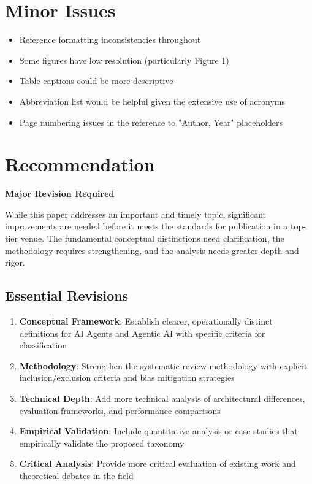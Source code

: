 \documentclass[12pt]{article}
\begin{document}
{\section{Minor Issues}

\begin{itemize}
\item Reference formatting inconsistencies throughout
\item Some figures have low resolution (particularly Figure 1)
\item Table captions could be more descriptive
\item Abbreviation list would be helpful given the extensive use of acronyms
\item Page numbering issues in the reference to "Author, Year" placeholders
\end{itemize}

\section{Recommendation}

\textbf{Major Revision Required}

While this paper addresses an important and timely topic, significant improvements are needed before it meets the standards for publication in a top-tier venue. The fundamental conceptual distinctions need clarification, the methodology requires strengthening, and the analysis needs greater depth and rigor.

\subsection{Essential Revisions}

\begin{enumerate}
\item \textbf{Conceptual Framework}: Establish clearer, operationally distinct definitions for AI Agents and Agentic AI with specific criteria for classification
\item \textbf{Methodology}: Strengthen the systematic review methodology with explicit inclusion/exclusion criteria and bias mitigation strategies
\item \textbf{Technical Depth}: Add more technical analysis of architectural differences, evaluation frameworks, and performance comparisons
\item \textbf{Empirical Validation}: Include quantitative analysis or case studies that empirically validate the proposed taxonomy
\item \textbf{Critical Analysis}: Provide more critical evaluation of existing work and theoretical debates in the field
\end{enumerate}

}
\end{document}
